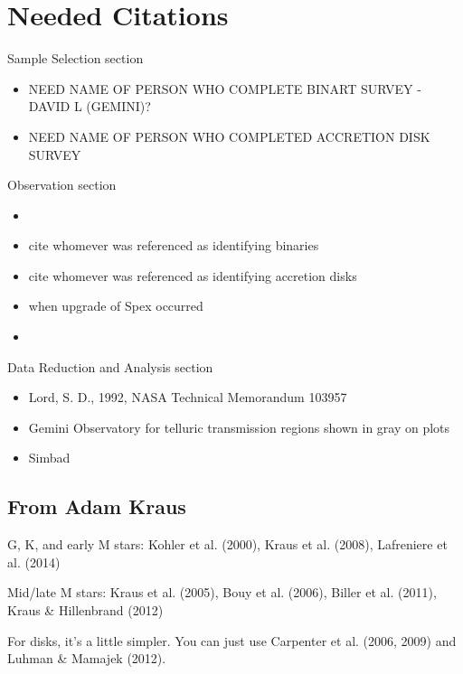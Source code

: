 \section{Needed Citations}

\begin{bf}Sample Selection section\end{bf}
	\begin{itemize}
		\item{} NEED NAME OF PERSON WHO COMPLETE BINART SURVEY - DAVID L (GEMINI)?
		\item{} NEED NAME OF PERSON WHO COMPLETED ACCRETION DISK SURVEY
\end{itemize}

\begin{bf}Observation section\end{bf}
	\begin{itemize}
		\item{} \cite{Rayner_2003}
		\item{} cite whomever was referenced as identifying binaries \cite{Adam_Krauss_or_other_paper}
		\item{} cite whomever was referenced as identifying accretion disks \cite{Carpenter_2006}
		\item{} when upgrade of Spex occurred \cite{Spex}\\
		\item{} \cite{2mass_catalog_for_j_mags}
	\end{itemize} 


\begin{bf}Data Reduction and Analysis section\end{bf}
	\begin{itemize}
		\item{} Lord, S. D., 1992, NASA Technical Memorandum 103957
		\item{} Gemini Observatory for telluric transmission regions shown in gray on plots
  		\item{} Simbad
  
	\end{itemize}

\subsection{From Adam Kraus}
G, K, and early M stars: Kohler et al. (2000), Kraus et al. (2008), Lafreniere et al. (2014)

Mid/late M stars: Kraus et al. (2005), Bouy et al. (2006), Biller et al. (2011), Kraus & Hillenbrand (2012)

For disks, it's a little simpler. You can just use Carpenter et al. (2006, 2009) and Luhman & Mamajek (2012). 
